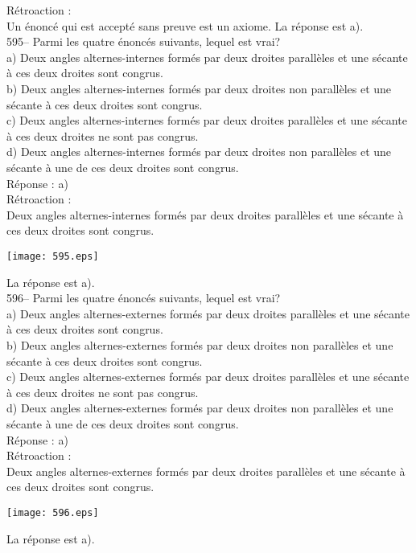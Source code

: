 ﻿\documentclass[letterpaper, 12pt]{article}
\begin{document}
R\'etroaction : \\
Un \'enonc\'e qui est accept\'e sans preuve est un
axiome.  La r\'eponse est a).  \\

595-- Parmi les quatre \'enonc\'es suivants, lequel est vrai?\\
a) Deux angles alternes-internes form\'es par deux droites parall\`eles et
une s\'ecante \`a ces deux droites sont congrus.\\
b) Deux angles alternes-internes form\'es par deux droites non parall\`eles
et une s\'ecante \`a ces deux droites sont congrus.\\
c) Deux angles alternes-internes form\'es par deux droites parall\`eles et
une s\'ecante \`a ces deux droites ne sont pas congrus.\\
d) Deux angles alternes-internes form\'es par deux droites non parall\`eles
et une s\'ecante \`a une de ces deux droites sont congrus.\\

R\'eponse : a)\\

R\'etroaction : \\
Deux angles alternes-internes form\'es par deux droites parall\`eles
et une s\'ecante \`a ces deux droites sont congrus.   \begin{center}
    \texttt{[image: 595.eps]}
    \end{center}  La r\'eponse est a).\\

596-- Parmi les quatre \'enonc\'es suivants, lequel est vrai?\\
a) Deux angles alternes-externes form\'es par deux droites parall\`eles et
une s\'ecante \`a ces deux droites sont congrus.\\
b) Deux angles alternes-externes form\'es par deux droites non parall\`eles
et une s\'ecante \`a ces deux droites sont congrus.\\
c) Deux angles alternes-externes form\'es par deux droites parall\`eles et
une s\'ecante \`a ces deux droites ne sont pas congrus.\\
d) Deux angles alternes-externes form\'es par deux droites non parall\`eles
et une s\'ecante \`a une de ces deux droites sont congrus.\\

R\'eponse : a)\\

R\'etroaction : \\
Deux angles alternes-externes form\'es par deux droites parall\`eles
et une s\'ecante \`a ces deux droites sont congrus.   \begin{center}
    \texttt{[image: 596.eps]}
    \end{center}  La r\'eponse est a).\\
\end{document}
